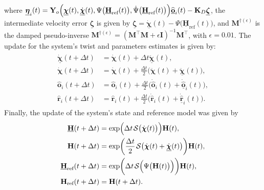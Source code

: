 where $\underline{\boldsymbol{\eta}}_i(t) = \mathbf{Y}_o\Bigl(\underline{\boldsymbol{\chi}}(t), \underline{\dot{\boldsymbol{\chi}}}(t), \Psi\bigl(\underline{\mathbf{H}}_\text{ref}(t)\bigr), \dot{\Psi}\bigl(\underline{\mathbf{H}}_\text{ref}(t)\bigr)\Bigr)\underline{\widehat{\mathbf{o}}}_i(t) - \mathbf{K}_D\underline{\boldsymbol{\zeta}}$, the intermediate velocity error $\underline{\boldsymbol{\zeta}}$ is given by $\underline{\boldsymbol{\zeta}}=\underline{\dot{\boldsymbol{\chi}}}(t) - \Psi\bigl(\underline{\mathbf{H}}_\text{ref}(t)\bigr)$, and $\mathbf{M}^{\dagger(\epsilon)}$ is the damped pseudo-inverse $\mathbf{M}^{\dagger(\epsilon)} = (\mathbf{M}^\top\mathbf{M} + \epsilon\mathbf{I})^{-1}\mathbf{M}^\top$, with $\epsilon=0.01$. The update for the system's twist and parameters estimates is given by:
\begin{align}
    \begin{split}
        \underline{\dot{\boldsymbol{\chi}}}(t + \Delta t) &= \dot{\boldsymbol{\chi}}(t) + \Delta t \ddot{\underline{\boldsymbol{\chi}}}(t),\\
        \dot{\boldsymbol{\chi}}(t + \Delta t) &= \dot{\boldsymbol{\chi}}(t) + \frac{\Delta t}{2} \bigl(\ddot{\boldsymbol{\chi}}(t) + \underline{\ddot{\boldsymbol{\chi}}}(t)\bigr),\\
        \widehat{\mathbf{o}}_i(t + \Delta t) &= \widehat{\mathbf{o}}_i(t) + \frac{\Delta t}{2} \bigl(\dot{\widehat{\mathbf{o}}}_i(t) + \underline{\dot{\widehat{\mathbf{o}}}}_i(t)\bigr),\\
        \widehat{\mathbf{r}}_i(t + \Delta t) &= \widehat{\mathbf{r}}_i(t) + \frac{\Delta t}{2} \bigl(\dot{\widehat{\mathbf{r}}}_i(t) + \underline{\dot{\widehat{\mathbf{r}}}}_i(t)\bigr).
    \end{split}
\end{align}
Finally, the update of the system's state and reference model was given by
\begin{align}
    \begin{split}
        \underline{\mathbf{H}}(t +\Delta t) &= \exp\Bigl(\Delta t\SL\bigl(\dot{\boldsymbol{\chi}}(t)\bigr)\Bigr)\mathbf{H}(t),\\
        \mathbf{H}(t + \Delta t) &= \exp\biggl(\frac{\Delta t}{2}\SL[\dot{\boldsymbol{\chi}}(t) + \underline{\dot{\boldsymbol{\chi}}}(t)]\biggr)\mathbf{H}(t),\\
        \underline{\mathbf{H}}_\text{ref}(t +\Delta t) &= \exp\biggl(\Delta t\SL\Bigl(\Psi\bigl(\mathbf{H}(t)\bigr)\Bigr)\biggr)\mathbf{H}(t),\\
        \mathbf{H}_\text{ref} (t + \Delta t) &= \mathbf{H}(t + \Delta t).
    \end{split}
\end{align}

